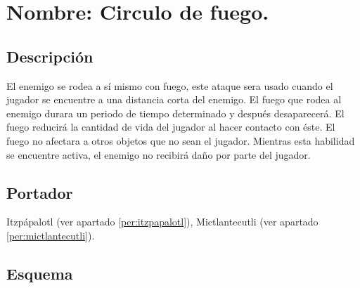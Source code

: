 \section{Nombre: Circulo de fuego.} \label{hab.CirFue}
\subsection{Descripción}
El enemigo se rodea a sí mismo con fuego, este ataque sera usado cuando el jugador se encuentre a una distancia corta del enemigo. El fuego que rodea al enemigo durara un periodo de tiempo determinado y después desaparecerá. El fuego reducirá la cantidad de vida del jugador al hacer contacto con éste. El fuego no afectara a otros objetos que no sean el jugador. Mientras esta habilidad se encuentre activa, el enemigo no recibirá daño por parte del jugador.
\subsection{Portador}
Itzpápalotl (ver apartado \ref{per:itzpapalotl}),  Mictlantecutli (ver apartado \ref{per:mictlantecutli}). 
\subsection{Esquema}
			
			